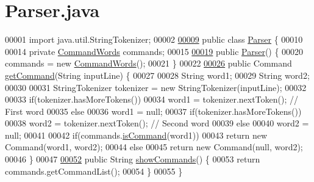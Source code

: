 \hypertarget{Parser_8java_source}{\section{Parser.\-java}
}

\begin{DoxyCode}
00001 \textcolor{keyword}{import} java.util.StringTokenizer;
00002 
\hypertarget{Parser_8java_source_l00009}{}\hyperlink{classParser}{00009} \textcolor{keyword}{public} \textcolor{keyword}{class }\hyperlink{classParser}{Parser} \{
00010 
00014     \textcolor{keyword}{private} \hyperlink{classCommandWords}{CommandWords} commands;
00015 
\hypertarget{Parser_8java_source_l00019}{}\hyperlink{classParser_a5b20dc7a1c7a26ce3cec6cc070839bd4}{00019}     \textcolor{keyword}{public} \hyperlink{classParser_a5b20dc7a1c7a26ce3cec6cc070839bd4}{Parser}() \{
00020         commands = \textcolor{keyword}{new} \hyperlink{classCommandWords}{CommandWords}();
00021     \}
00022 
\hypertarget{Parser_8java_source_l00026}{}\hyperlink{classParser_a5ee0a1ad3df67b8814d34c81e7276371}{00026}     \textcolor{keyword}{public} Command \hyperlink{classParser_a5ee0a1ad3df67b8814d34c81e7276371}{getCommand}(String inputLine) \{
00027 
00028         String word1;
00029         String word2;
00030 
00031         StringTokenizer tokenizer = \textcolor{keyword}{new} StringTokenizer(inputLine);
00032 
00033         \textcolor{keywordflow}{if}(tokenizer.hasMoreTokens())
00034             word1 = tokenizer.nextToken();  \textcolor{comment}{// First word}
00035         \textcolor{keywordflow}{else}
00036             word1 = null;
00037         \textcolor{keywordflow}{if}(tokenizer.hasMoreTokens())
00038             word2 = tokenizer.nextToken();  \textcolor{comment}{// Second word}
00039         \textcolor{keywordflow}{else}
00040             word2 = null;
00041 
00042         \textcolor{keywordflow}{if}(commands.\hyperlink{classCommandWords_a98619d278b3fa23fed18b5834f9d20a8}{isCommand}(word1))
00043             \textcolor{keywordflow}{return} \textcolor{keyword}{new} Command(word1, word2);
00044         \textcolor{keywordflow}{else}
00045             \textcolor{keywordflow}{return} \textcolor{keyword}{new} Command(null, word2);
00046     \}
00047 
\hypertarget{Parser_8java_source_l00052}{}\hyperlink{classParser_ae99d8549c08045804cc52576d7b4b453}{00052}     \textcolor{keyword}{public} String \hyperlink{classParser_ae99d8549c08045804cc52576d7b4b453}{showCommands}() \{
00053         \textcolor{keywordflow}{return} commands.getCommandList();
00054     \}
00055 \}
\end{DoxyCode}

